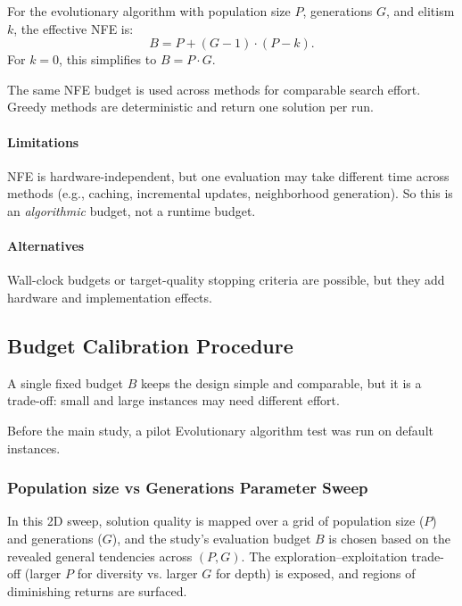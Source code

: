 \documentclass[12pt,a4paper]{report}
\begin{document}
For the evolutionary algorithm with population size \(P\), generations \(G\), and elitism \(k\), the effective NFE is:
\[
B = P + (G - 1)\cdot(P-k).
\]
For \(k=0\), this simplifies to \(B = P\cdot G\).

The same NFE budget is used across methods for comparable search effort. Greedy methods are deterministic and return one solution per run.

\paragraph{Limitations} NFE is hardware-independent, but one evaluation may take different time across methods (e.g., caching, incremental updates, neighborhood generation). So this is an \emph{algorithmic} budget, not a runtime budget.

\paragraph{Alternatives} Wall-clock budgets or target-quality stopping criteria are possible, but they add hardware and implementation effects.

\subsection{Budget Calibration Procedure}

A single fixed budget \(B\) keeps the design simple and comparable, but it is a trade-off: small and large instances may need different effort.

Before the main study, a pilot Evolutionary algorithm test was run on default instances.

\subsubsection*{Population size vs Generations Parameter Sweep}
In this 2D sweep, solution quality is mapped over a grid of population size ($P$) and generations ($G$), and the study’s evaluation budget $B$ is chosen based on the revealed general tendencies across $(P,G)$. The exploration–exploitation trade-off (larger $P$ for diversity vs. larger $G$ for depth) is exposed, and regions of diminishing returns are surfaced.
\end{document}
